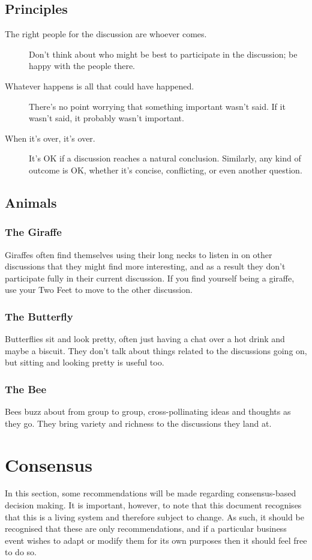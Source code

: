 \documentclass[a4paper, 11pt]{article} %
\begin{document}
\subsection{Principles}
\begin{description}
\item[The right people for the discussion are whoever comes.]  Don't think about who might be best to participate in the discussion; be happy with the people there.
\item[Whatever happens is all that could have happened.]  There's no point worrying that something important wasn't said.  If it wasn't said, it probably wasn't important.
\item[When it's over, it's over.]  It's OK if a discussion reaches a natural conclusion.  Similarly, any kind of outcome is OK, whether it's concise, conflicting, or even another question.
\end{description}

\subsection{Animals}
\subsubsection{The Giraffe}
Giraffes often find themselves using their long necks to listen in on other discussions that they might find more interesting, and as a result they don't participate fully in their current discussion.  If you find yourself being a giraffe, use your Two Feet to move to the other discussion.

\subsubsection{The Butterfly}
Butterflies sit and look pretty, often just having a chat over a hot drink and maybe a biscuit.  They don't talk about things related to the discussions going on, but sitting and looking pretty is useful too.

\subsubsection{The Bee}
Bees buzz about from group to group, cross-pollinating ideas and thoughts as they go.  They bring variety and richness to the discussions they land at.

\section{Consensus}
\label{sec:consensus}
In this section, some recommendations will be made regarding consensus-based decision making.  It is important, however, to note that this document recognises that this is a living system and therefore subject to change.  As such, it should be recognised that these are only recommendations, and if a particular business event wishes to adapt or modify them for its own purposes then it should feel free to do so.
\end{document}
